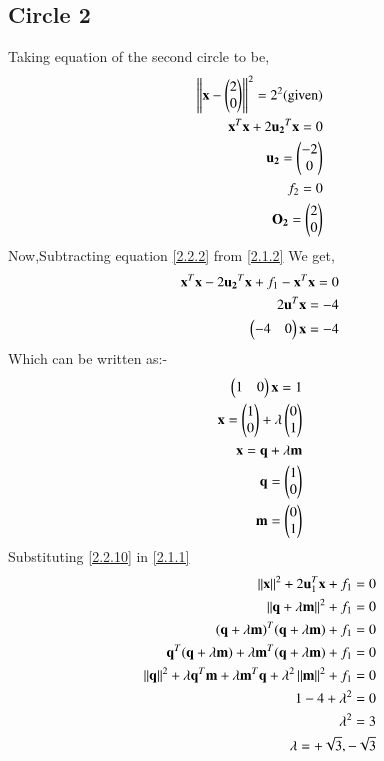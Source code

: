 \documentclass[journal,12pt,twocolumn]{IEEEtran}
\begin{document}
 \subsection{Circle 2}
Taking equation of the second circle to be,
\begin{align}
  \left\lVert\mathbf{x}-\begin{pmatrix}2\\0\end{pmatrix}\right\rVert^2=2^2 \text{(given)}\\
  {\mathbf{x}^{T}\mathbf{x}+2\mathbf{u_2}^T\mathbf{x}}=0 \label{2.2.2}\\
  \mathbf{u_2}=\begin{pmatrix}-2\\0\end{pmatrix}\\
 f_2=0\\
 \mathbf{O_2}=\begin{pmatrix}2\\0\end{pmatrix}
  \end{align}
 Now,Subtracting equation \eqref{2.2.2} from \eqref{2.1.2} We get,
 \begin{align}
 \mathbf{x}^T\mathbf{x}-2\mathbf{u_2}^T\mathbf{x}+f_1-\mathbf{x}^{T}\mathbf{x}=0\\
 2\mathbf{u}^{T}\mathbf{x}=-4\\
 \begin{pmatrix}-4&0\end{pmatrix}\mathbf{x}=-4
 \end{align}
 Which can be written as:-
 \begin{align}
 \begin{pmatrix}1&0\end{pmatrix}\mathbf{x}=1\\
 \mathbf{x}=\begin{pmatrix}1 \\ 0\end{pmatrix} + \lambda \begin{pmatrix}0\\1\end{pmatrix}\\
\mathbf{x}=\mathbf{q}+\lambda\mathbf{m}\label{2.2.10}\\
\mathbf{q}=\begin{pmatrix}1 \\ 0\end{pmatrix} \\
\mathbf{m}=\begin{pmatrix}0\\1\end{pmatrix}
  \end{align}
 Substituting \eqref{2.2.10} in \eqref{2.1.1}
  \begin{align}
 \left\lVert\mathbf{x}\right\rVert^2 + 2\mathbf{u}_1^T\mathbf{x} + f_1 = 0\\
 \left\lVert\mathbf{q}+\lambda\mathbf{m}\right\rVert^2 + f_1 = 0\\
 (\mathbf{q}+\lambda \mathbf{m})^T(\mathbf{q}+\lambda \mathbf{m})+f_1=0\\
 \mathbf{q}^T(\mathbf{q}+\lambda \mathbf{m})+\lambda \mathbf{m}^T(\mathbf{q}+\lambda \mathbf{m})+f_1=0\\
 \left\lVert\mathbf{q}\right\rVert^2+\lambda\mathbf{q}^T\mathbf{m}+\lambda\mathbf{m}^T\mathbf{q}+\lambda^2\left\lVert\mathbf{m}\right\rVert^2+f_1=0\\
1-4+\lambda^2=0\\
\lambda^2=3\\
 \lambda=+\sqrt{3},-\sqrt{3}
 \end{align}
\end{document}
